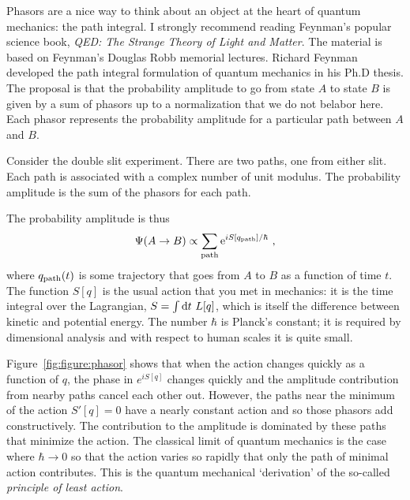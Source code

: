 Phasors are a nice way to think about an object at the heart of quantum mechanics: the path integral. I strongly recommend reading Feynman's popular science book, \emph{QED: The Strange Theory of Light and Matter}\autocite{Feynman:1986er}. The material is based on Feynman's Douglas Robb memorial lectures.
% 
Richard Feynman developed the path integral formulation of quantum mechanics in his Ph.D thesis\autocite{Feynman:1942us}. The proposal is that the probability amplitude to go from state $A$ to state $B$ is given by a sum of phasors up to a normalization that we do not belabor here. Each phasor represents the probability amplitude for a particular path between $A$ and $B$. 
\begin{example}
Consider the double slit experiment. There are two paths, one from either slit. Each path is associated with a complex number of unit modulus. The probability amplitude is the sum of the phasors for each path. 
\end{example}
The probability amplitude is thus
\begin{align}
    \Psi(A\to B) \propto \sum_\textnormal{path}
    \operatorname{e}^{iS[q_\textnormal{path}]/\hbar} \ ,
\end{align}
where $q_\textnormal{path}(t)$ is some trajectory that goes from $A$ to $B$ as a function of time $t$. The function $S[q]$ is the usual action that you met in mechanics: it is the time integral over the Lagrangian, $S=\int\operatorname{d}\mkern-3mu^{}\mkern-1mu{t}\,\, L[q]$, which is itself the difference between kinetic and potential energy. The number $\hbar$ is Planck's constant; it is required by dimensional analysis and with respect to human scales it is quite small.

Figure~\ref{fig:figure:phasor} shows that when the action changes quickly as a function of $q$, the phase in $e^{iS[q]}$ changes quickly and the amplitude contribution from nearby paths cancel each other out. However, the paths near the minimum of the action $S'[q]=0$ have a nearly constant action and so those phasors add constructively. The contribution to the amplitude is dominated by these paths that minimize the action. The classical limit of quantum mechanics is the case where $\hbar \to 0$ so that the action varies so rapidly that only the path of minimal action contributes. This is the quantum mechanical `derivation' of the so-called \emph{principle of least action}.

